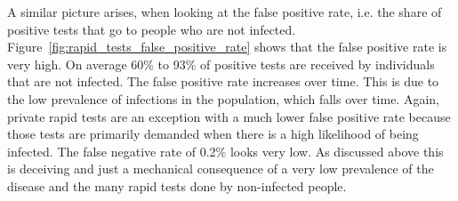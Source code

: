 \FloatBarrier

A similar picture arises, when looking at the false positive rate, i.e. the share of
positive tests that go to people who are not infected.
Figure~\ref{fig:rapid_tests_false_positive_rate} shows that the false positive rate is
very high. On average 60\% to 93\% of positive tests are received by individuals that
are not infected. The false positive rate increases over time. This is due to the low
prevalence of infections in the population, which falls over time. Again, private rapid
tests are an exception with a much lower false positive rate because those tests are
primarily demanded when there is a high likelihood of being infected. The false negative
rate of 0.2\% looks very low. As discussed above this is deceiving and just a mechanical
consequence of a very low prevalence of the disease and the many rapid tests done by
non-infected people.

